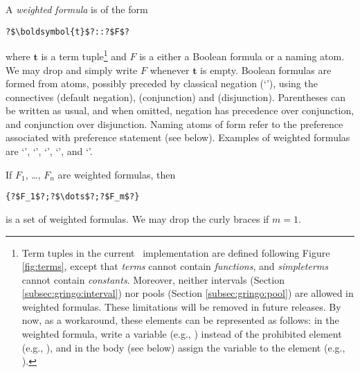 A \emph{weighted formula} is of the form
\begin{lstlisting}[numbers=none,escapechar=?]
?$\boldsymbol{t}$?::?$F$?
\end{lstlisting}
where $\boldsymbol{t}$ is a term tuple\footnote{%
Term tuples in the current \asprin\ implementation are defined following Figure \ref{fig:terms}, 
except that \emph{terms} cannot contain \emph{functions}, 
and \emph{simpleterms} cannot contain \emph{constants}. 
Moreover, neither intervals (Section \ref{subsec:gringo:interval}) nor pools  (Section \ref{subsec:gringo:pool})
are allowed in weighted formulas. 
These limitations will be removed in future releases. 
By now, as a workaround, these elements can be represented as follows:
in the weighted formula, write a variable (e.g., ) instead of the prohibited element (e.g., ),  
and in the body (see below) assign the variable to the element (e.g., ).
}
and $F$ is a either a Boolean formula or a naming atom.
We may drop \code{::} and simply write $F$ whenever $\boldsymbol{t}$ is empty.
Boolean formulas are formed from atoms, possibly preceded by classical negation (`\code{-}'),
using the connectives  (default negation), \code{\&} (conjunction) and \code{|} (disjunction).
Parentheses can be written as usual,
and when omitted, negation has precedence over conjunction, and conjunction over disjunction.
%
Naming atoms of form 
refer to the preference associated with preference statement  (see below).
%
Examples of weighted formulas are 
`', 
`', 
`', 
`', and 
`'. 

If $F_1$, \ldots, $F_n$ are weighted formulas, then
\begin{lstlisting}[numbers=none,escapechar=?]
{?$F_1$?;?$\dots$?;?$F_m$?}
\end{lstlisting}
is a set of weighted formulas.
We may drop the curly braces if $m=1$.

